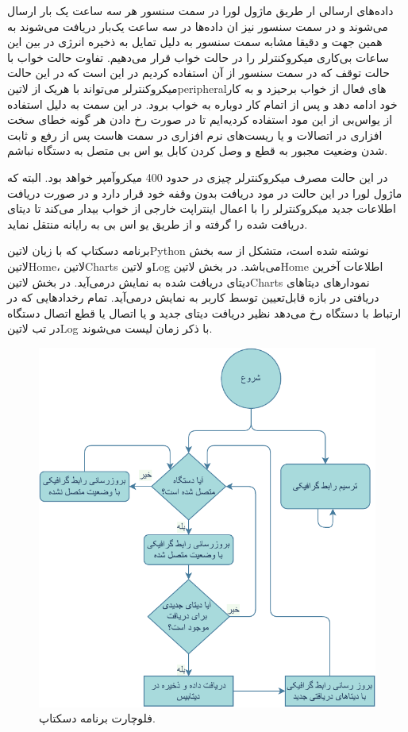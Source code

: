 داده‌های ارسالی ار طریق ماژول لورا در سمت سنسور هر سه ساعت یک بار ارسال می‌شوند و در سمت سنسور نیز ان داده‌ها در سه ساعت یک‌بار دریافت می‌شوند به همین جهت و دقیقا مشابه سمت سنسور به دلیل تمایل به ذخیره انرژی در بین این ساعات بی‌کاری میکروکنترلر را در حالت خواب قرار می‌دهیم. تفاوت حالت خواب با حالت توقف که در سمت سنسور از آن استفاده کردیم در این است که در این حالت میکروکنترلر می‌تواند با هریک از ‌لاتین{peripheral}‌های فعال از خواب برحیزد و به کار خود ادامه دهد و پس از اتمام کار دوباره به خواب برود. در این سمت به دلیل استفاده از یو‌اس‌بی از این مود استفاده کردیه‌ایم تا در صورت رخ دادن هر گونه خطای سخت افزاری در اتصالات و یا ریست‌های نرم افزاری در سمت هاست پس از رفع و ثابت شدن وضعیت مجبور به قطع و وصل کردن کابل یو اس بی متصل به دستگاه نباشم. 

در این حالت مصرف میکروکنترلر چیزی در حدود 400 میکروآمپر خواهد بود. البته که ماژول لورا در این حالت در مود دریافت بدون وقفه خود قرار دارد و در صورت دریافت اطلاعات جدید میکروکنترلر را با اعمال اینتراپت خارجی از خواب بیدار می‌کند تا دیتای دریافت شده را گرفته و از طریق یو اس بی به رایانه منتقل نماید. 

برنامه دسکتاپ که با زبان ‌لاتین{Python} نوشته شده است، متشکل از سه بخش ‌لاتین{Home}، ‌لاتین{Charts} و ‌لاتین{Log} می‌باشد. در بخش ‌لاتین{Home} اطلاعات آخرین دیتای دریافت شده به نمایش درمی‌آید. در بخش ‌لاتین{Charts} نمودارهای دیتاهای دریافتی در بازه قابل‌تعیین توسط کاربر به نمایش درمی‌آید. تمام رخدادهایی که در ارتباط با دستگاه رخ می‌دهد نظیر دریافت دیتای جدید و یا اتصال یا قطع اتصال دستگاه در تب ‌لاتین{Log} با ذکر زمان لیست می‌شوند. 

\begin{figure}[H]
	\centering
	\includegraphics[width=0.7\linewidth]{Assets/USBFlowChart.pdf}
	\caption{فلوچارت برنامه دسکتاپ.}
	\label{fig:USBFlowChart}
\end{figure}

